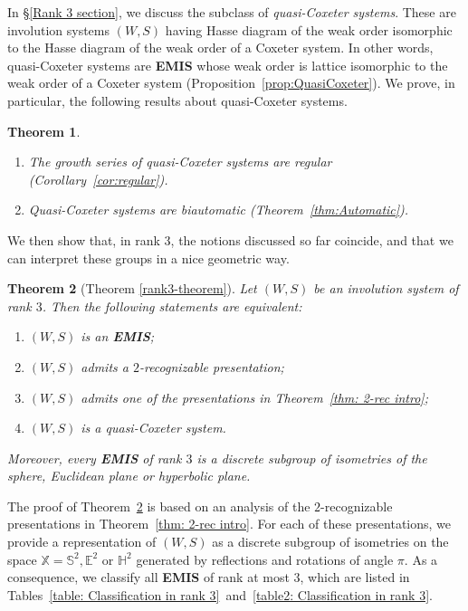 \documentclass[A4paper, oneside]{amsart}
\newcommand{\Sb}{\mathbb{S}}
\newcommand{\E}{\mathbb{E}}
\newcommand{\Hb}{\mathbb{H}}
\newcommand{\X}{\mathbb{X}}
\newcommand{\EMIS}{\textnormal{\bf EMIS}\xspace}
\newtheorem{thm}{Theorem}[section]
\theoremstyle{definition}
\begin{document}
In \S\ref{Rank 3 section}, we discuss the subclass of {\em quasi-Coxeter systems}. These are involution systems $(W,S)$ having Hasse diagram of the weak order isomorphic to the Hasse diagram of the weak order of a Coxeter system. In other words, quasi-Coxeter systems are \EMIS whose weak order is lattice isomorphic to the weak order of a Coxeter system (Proposition~\ref{prop:QuasiCoxeter}). We prove, in particular, the following results about quasi-Coxeter systems.

\begin{thm} $\ $
\label{thm:2} 
\begin{enumerate}
\item The growth series of quasi-Coxeter systems are regular (Corollary~\ref{cor:regular}).
\item  Quasi-Coxeter systems are biautomatic (Theorem~\ref{thm:Automatic}).
\end{enumerate}
\end{thm}

We then show that, in rank 3, the notions discussed so far coincide, and that we can interpret these groups in a nice geometric way.

\begin{thm}[Theorem \ref{rank3-theorem}] \label{thm: rank 3 intro}
	Let $(W,S)$ be an involution system of rank $3$. Then the following statements are equivalent:
	\begin{enumerate}
		\item $(W,S)$ is an \EMIS; 
		\item $(W,S)$ admits a $2$-recognizable presentation; 
		\item $(W,S)$ admits one of the presentations in Theorem~\ref{thm: 2-rec intro}; 
		\item $(W,S)$ is a quasi-Coxeter system.
	\end{enumerate}
	Moreover, every \EMIS of rank $3$ is a discrete subgroup of isometries of the sphere, Euclidean plane or hyperbolic plane.
\end{thm}

 The proof of Theorem~\ref{thm: rank 3 intro} is based on an analysis of the $2$-recognizable presentations in Theorem~\ref{thm: 2-rec intro}. For each of these presentations, we provide a representation of $(W,S)$ as a discrete subgroup of isometries on the space $\X = \Sb^2, \E^2$ or $\Hb^2$ generated by reflections and rotations of angle $\pi$.  As a consequence, we classify all \EMIS of rank at most $3$, which are listed in Tables~\ref{table: Classification in rank 3}~and~\ref{table2: Classification in rank 3}. 
\end{document}
